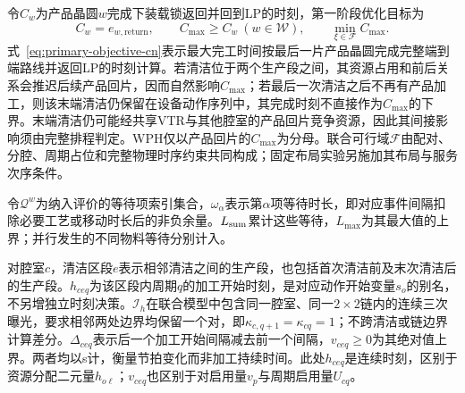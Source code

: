 \documentclass[final,5p,times,twocolumn]{elsarticle}
\begin{document}
令$C_w$为产品晶圆$w$完成下装载锁返回并回到LP的时刻，第一阶段优化目标为
\begin{equation}
C_w=e_{w,\mathrm{return}},\qquad
C_{\max}\ge C_w\ (w\in\mathcal W),\qquad
\min_{\xi\in\mathcal F}C_{\max}.
\label{eq:primary-objective-cn}
\end{equation}
式~\eqref{eq:primary-objective-cn}表示最大完工时间按最后一片产品晶圆完成完整端到端路线并返回LP的时刻计算。若清洁位于两个生产段之间，其资源占用和前后关系会推迟后续产品回片，因而自然影响$C_{\max}$；若最后一次清洁之后不再有产品加工，则该末端清洁仍保留在设备动作序列中，其完成时刻不直接作为$C_{\max}$的下界。末端清洁仍可能经共享VTR与其他腔室的产品回片竞争资源，因此其间接影响须由完整排程判定。WPH仅以产品回片的$C_{\max}$为分母。联合可行域$\mathcal F$由配对、分腔、周期占位和完整物理时序约束共同构成；固定布局实验另施加其布局与服务次序条件。

令$\mathcal Q^w$为纳入评价的等待项索引集合，$\omega_\alpha$表示第$\alpha$项等待时长，即对应事件间隔扣除必要工艺或移动时长后的非负余量。$L_{\rm sum}$累计这些等待，$L_{\max}$为其最大值的上界；并行发生的不同物料等待分别计入。

对腔室$c$，清洁区段$e$表示相邻清洁之间的生产段，也包括首次清洁前及末次清洁后的生产段。$h_{ceq}$为该区段内周期$q$的加工开始时刻，是对应动作开始变量$s_o$的别名，不另增独立时刻决策。$\mathcal I_h$在联合模型中包含同一腔室、同一$2\times2$链内的连续三次曝光，要求相邻两处边界均保留一个对，即$\kappa_{c,q+1}=\kappa_{cq}=1$；不跨清洁或链边界计算差分。$\Delta_{ceq}$表示后一个加工开始间隔减去前一个间隔，$v_{ceq}\ge0$为其绝对值上界。两者均以s计，衡量节拍变化而非加工持续时间。此处$h_{ceq}$是连续时刻，区别于资源分配二元量$h_{o\ell}$；$v_{ceq}$也区别于对启用量$v_p$与周期启用量$U_{cq}$。
\end{document}
